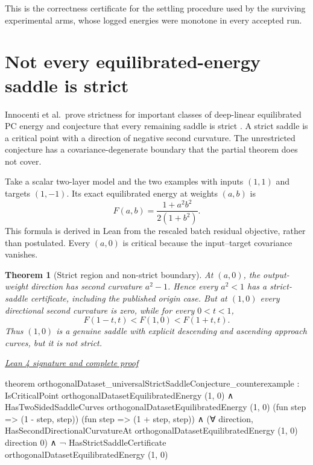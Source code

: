\documentclass[11pt]{article}
\newtheorem{theorem}{Theorem}[section]
\newcommand{\leancommit}{647168959fc57cfe97526d9525d33e63681b8e2f}
\newcommand{\leansignaturelink}[2]{%
  \par\Needspace{0.3\textheight}\smallskip\noindent
  \href{https://github.com/zariuq/MeTTapedia/blob/\leancommit/#1\#L#2}{%
    \scriptsize\itshape Lean 4 signature and complete proof}\par\nobreak}
\begin{document}
This is the correctness certificate for the settling procedure used by the surviving
experimental arms, whose logged energies were monotone in every accepted run.

\section{Not every equilibrated-energy saddle is strict}
\label{sec:saddles}

Innocenti et al.\ prove strictness for important classes of deep-linear equilibrated PC
energy and conjecture that every remaining saddle is strict \cite{innocenti2025}. A
strict saddle is a critical point with a direction of negative second curvature. The
unrestricted conjecture has a covariance-degenerate boundary that the partial theorem
does not cover.

Take a scalar two-layer model and the two examples with inputs $(1,1)$ and targets
$(1,-1)$. Its exact equilibrated energy at weights $(a,b)$ is
\[
F(a,b)=\frac{1+a^2b^2}{2(1+b^2)}.
\]
This formula is derived in Lean from the rescaled batch residual objective, rather than
postulated. Every $(a,0)$ is critical because the input--target covariance vanishes.

\begin{theorem}[Strict region and non-strict boundary]\label{thm:saddles}
At $(a,0)$, the output-weight direction has second curvature $a^2-1$. Hence every
$a^2<1$ has a strict-saddle certificate, including the published origin case. But at
$(1,0)$ every directional second curvature is zero, while for every $0<t<1$,
\[
F(1-t,t)<F(1,0)<F(1+t,t).
\]
Thus $(1,0)$ is a genuine saddle with explicit descending and ascending approach curves,
but it is not strict.
\end{theorem}

\leansignaturelink{lean/mettapedia/Mettapedia/MachineLearning/NeuralNetworks/%
PredictiveCoding/EquilibratedEnergySaddles.lean}{319}
\begin{leansignature}
theorem orthogonalDataset_universalStrictSaddleConjecture_counterexample :
    IsCriticalPoint orthogonalDatasetEquilibratedEnergy (1, 0) ∧
      HasTwoSidedSaddleCurves orthogonalDatasetEquilibratedEnergy (1, 0)
        (fun step => (1 - step, step))
        (fun step => (1 + step, step)) ∧
      (∀ direction,
        HasSecondDirectionalCurvatureAt orthogonalDatasetEquilibratedEnergy
          (1, 0) direction 0) ∧
      ¬ HasStrictSaddleCertificate orthogonalDatasetEquilibratedEnergy (1, 0)
\end{leansignature}
\end{document}
